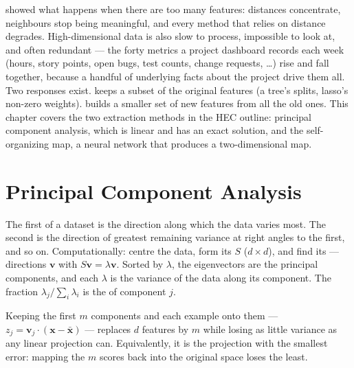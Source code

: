  showed what happens when there are too many features: distances
concentrate, neighbours stop being meaningful, and every method that relies on
distance degrades. High-dimensional data is also slow to process, impossible to
look at, and often redundant --- the forty metrics a project dashboard records
each week (hours, story points, open bugs, test counts, change requests, \dots) rise
and fall together, because a handful of underlying facts about the project drive
them all. Two responses exist. 
keeps a subset of the original features (a tree's splits, lasso's non-zero weights).
 builds a smaller set of new features from all the old
ones. This chapter covers the two extraction methods in the HEC outline: principal
component analysis, which is linear and has an exact solution, and the
self-organizing map, a neural network that produces a two-dimensional map.

\section{Principal Component Analysis}

\begin{definitionbox}
The first  of a dataset is the direction along which the
data varies most. The second is the direction of greatest remaining variance at right
angles to the first, and so on. Computationally: centre the data, form its
 $S$ ($d \times d$), and find its  ---
directions $\mathbf{v}$ with $S\mathbf{v} = \lambda\mathbf{v}$. Sorted by
 $\lambda$, the eigenvectors are the principal components, and each
$\lambda$ is the variance of the data along its component. The fraction
$\lambda_j / \sum_i \lambda_i$ is the  of component $j$.
\end{definitionbox}

Keeping the first $m$ components and  each example onto them ---
$z_j = \mathbf{v}_j \cdot (\mathbf{x} - \bar{\mathbf{x}})$ --- replaces $d$ features by
$m$ while losing as little variance as any linear projection can. Equivalently, it is
the projection with the smallest  error: mapping the $m$ scores
back into the original space loses the least.

